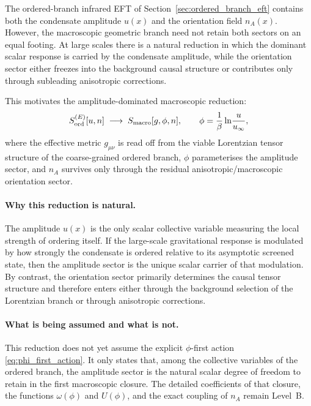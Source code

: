 \documentclass[11pt,a4paper]{article}
\numberwithin{equation}{section}
\begin{document}
The ordered-branch infrared EFT of
Section~\ref{sec:ordered_branch_eft} contains both the condensate
amplitude $u(x)$ and the orientation field $n_A(x)$.
However, the macroscopic geometric branch need not retain both sectors
on an equal footing.
At large scales there is a natural reduction in which the dominant
scalar response is carried by the condensate amplitude, while the
orientation sector either freezes into the background causal structure
or contributes only through subleading anisotropic corrections.

This motivates the amplitude-dominated macroscopic reduction:
\begin{equation}
  \label{eq:amplitude_dominated_reduction}
  S_{\rm ord}^{(E)}[u,n]
  \;\longrightarrow\;
  S_{\rm macro}[g,\phi,n],
  \qquad
  \phi=\frac{1}{\beta}\ln\!\frac{u}{u_\infty},
\end{equation}
where the effective metric $g_{\mu\nu}$ is read off from the viable
Lorentzian tensor structure of the coarse-grained ordered branch,
$\phi$ parameterises the amplitude sector, and $n_A$ survives only
through the residual anisotropic/macroscopic orientation sector.

\paragraph{Why this reduction is natural.}
The amplitude $u(x)$ is the only scalar collective variable measuring
the local strength of ordering itself.
If the large-scale gravitational response is modulated by how strongly
the condensate is ordered relative to its asymptotic screened state,
then the amplitude sector is the unique scalar carrier of that
modulation.
By contrast, the orientation sector primarily determines the causal
tensor structure and therefore enters either through the background
selection of the Lorentzian branch or through anisotropic corrections.

\paragraph{What is being assumed and what is not.}
This reduction does not yet assume the explicit $\phi$-first action
\eqref{eq:phi_first_action}.
It only states that, among the collective variables of the ordered
branch, the amplitude sector is the natural scalar degree of freedom
to retain in the first macroscopic closure.
The detailed coefficients of that closure, the functions $\omega(\phi)$
and $U(\phi)$, and the exact coupling of $n_A$ remain Level~B.
\end{document}
